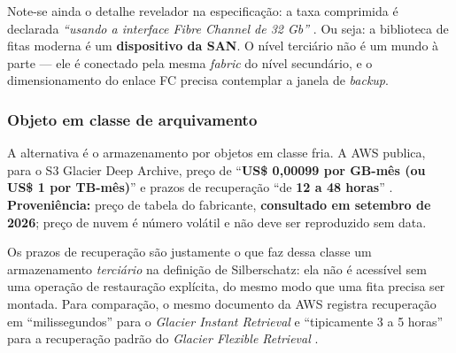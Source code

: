 \documentclass[11pt,a4paper]{article}
\begin{document}
Note-se ainda o detalhe revelador na especificação: a taxa comprimida é declarada
\emph{``usando a interface \textit{Fibre Channel} de 32 Gb''} \cite{lto10}. Ou seja: a biblioteca de
fitas moderna é um \textbf{dispositivo da SAN}. O nível terciário não é um mundo à parte --- ele é
conectado pela mesma \textit{fabric} do nível secundário, e o dimensionamento do enlace FC precisa
contemplar a janela de \textit{backup}.

\subsubsection*{Objeto em classe de arquivamento}

A alternativa é o armazenamento por objetos em classe fria. A AWS publica, para o S3 Glacier Deep
Archive, preço de ``\textbf{US\$ 0,00099 por GB-mês (ou US\$ 1 por TB-mês)}'' e prazos de
recuperação ``de \textbf{12 a 48 horas}'' \cite{awsglacier}. \textbf{Proveniência:} preço de tabela
do fabricante, \textbf{consultado em setembro de 2026}; preço de nuvem é número volátil e não deve
ser reproduzido sem data.

Os prazos de recuperação são justamente o que faz dessa classe um armazenamento \emph{terciário} na
definição de Silberschatz: ela não é acessível sem uma operação de restauração explícita, do mesmo
modo que uma fita precisa ser montada. Para comparação, o mesmo documento da AWS registra
recuperação em ``milissegundos'' para o \textit{Glacier Instant Retrieval} e ``tipicamente 3 a 5
horas'' para a recuperação padrão do \textit{Glacier Flexible Retrieval} \cite{awsglacier}.
\end{document}
